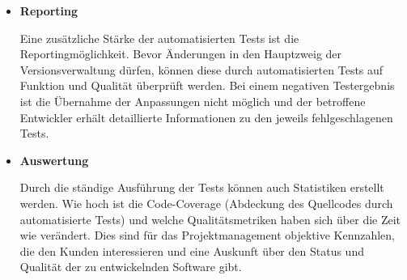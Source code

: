 \begin{itemize}
	\item \textbf{Reporting}
	
	Eine zusätzliche Stärke der automatisierten Tests ist die Reportingmöglichkeit. Bevor Änderungen in den Hauptzweig der Versionsverwaltung dürfen, können diese durch automatisierten Tests auf Funktion und Qualität überprüft werden. Bei einem negativen Testergebnis ist die Übernahme der Anpassungen nicht möglich und der betroffene Entwickler erhält detaillierte Informationen zu den jeweils fehlgeschlagenen Tests.
	
	\item \textbf{Auswertung}
	
	Durch die ständige Ausführung der Tests können auch Statistiken erstellt werden. Wie hoch ist die Code-Coverage (Abdeckung des Quellcodes durch automatisierte Tests) und welche Qualitätsmetriken haben sich über die Zeit wie verändert. Dies sind für das Projektmanagement objektive Kennzahlen, die den Kunden interessieren und eine Auskunft über den Status und Qualität der zu entwickelnden Software gibt.

\end{itemize}

